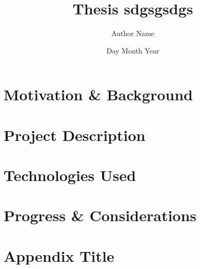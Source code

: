 \documentclass[12pt,twoside]{report}
\title{Thesis sdgsgsdgs}
\author{Author Name}
\date{Day Month Year}
\begin{document}







\tableofcontents
\label{toc}



\chapter{Motivation \& Background}


\chapter{Project Description}


\chapter{Technologies Used}


\chapter{Progress \& Considerations} 

 \appendix
\chapter{Appendix Title}

\printbibliography
\end{document}
